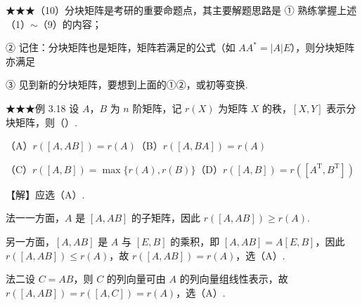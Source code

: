 \begin{fcard}{★★★（10）分块矩阵是考研的重要命题点，其主要解题思路是}
① 熟练掌握上述（1）$\sim$（9）的内容；

② 记住：分块矩阵也是矩阵，矩阵若满足的公式（如 $AA^{*}=|A|E$），则分块矩阵亦满足

③ 见到新的分块矩阵，要想到上面的①②，或初等变换.
\end{fcard}

\begin{fcard}{★★★例 3.18}
设 $A$，$B$ 为 $n$ 阶矩阵，记 $r(X)$ 为矩阵 $X$ 的秩，$[X,Y]$ 表示分块矩阵，则（\quad）.

（A）$r([A,AB])=r(A)$\qquad\qquad（B）$r([A,BA])=r(A)$

（C）$r([A,B])=\max\{r(A),r(B)\}$\qquad（D）$r([A,B])=r([A^{\mathrm{T}},B^{\mathrm{T}}])$

【解】应选（A）.

法一\quad 一方面，$A$ 是 $[A,AB]$ 的子矩阵，因此 $r([A,AB])\geqslant r(A)$.

另一方面，$[A,AB]$ 是 $A$ 与 $[E,B]$ 的乘积，即 $[A,AB]=A[E,B]$，因此 $r([A,AB])\leqslant r(A)$，故 $r([A,AB])=r(A)$，选（A）.

法二\quad 设 $C=AB$，则 $C$ 的列向量可由 $A$ 的列向量组线性表示，故 $r([A,AB])=r([A,C])=r(A)$，选（A）.
\end{fcard}

